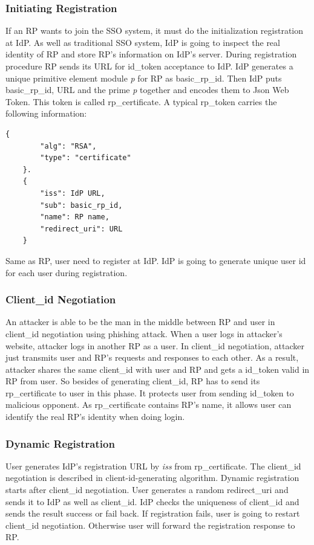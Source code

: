 

\subsubsection{Initiating Registration}
If an RP wants to join the SSO system, it must do the initialization registration at IdP. 
As well as traditional SSO system, IdP is going to inspect the real identity of RP and store RP's information on IdP's server.
During registration procedure RP sends its URL for id\_token acceptance to IdP. IdP generates a unique primitive element module \emph{p} for RP as basic\_rp\_id. Then IdP puts basic\_rp\_id, URL and the prime \emph{p} together and encodes them to Json Web Token. This token is called rp\_certificate. A typical rp\_token carries the following information:
\begin{lstlisting}[language={[ANSI]C},%frame=shadowbox, 
   basicstyle=\ttfamily]  
    {
        "alg": "RSA",
        "type": "certificate"
    }.
    {
        "iss": IdP URL,
        "sub": basic_rp_id,
        "name": RP name,
        "redirect_uri": URL
    }
\end{lstlisting} 

Same as RP, user need to register at IdP. IdP is going to generate unique user id for each user during registration. 
\subsubsection{Client\_id Negotiation}
An attacker is able to be the man in the middle between RP and user in client\_id negotiation using phishing attack. When a user logs in attacker's website, attacker logs in another RP as a user. In client\_id negotiation, attacker just transmits user and RP's requests and responses to each other. As a result, attacker shares the same client\_id with user and RP and gets a id\_token valid in RP from user.
So besides of generating client\_id, RP has to send its rp\_certificate to user in this phase. It protects user from sending id\_token to malicious opponent. As rp\_certificate contains RP's name, it allows user can identify the real RP's identity when doing login.
\subsubsection{Dynamic Registration}
User generates IdP's registration URL by \emph{iss} from rp\_certificate. 
The client\_id negotiation is described in client-id-generating algorithm. Dynamic registration starts after client\_id negotiation. User generates a random redirect\_uri and sends it to IdP as well as client\_id. IdP checks the uniqueness of client\_id and sends the result success or fail back. If registration fails, user is going to restart client\_id negotiation. Otherwise user will forward the registration response to RP.  

